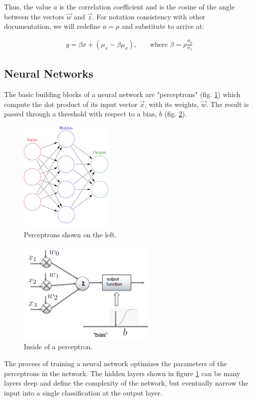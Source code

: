 \documentclass[11pt,a4paper]{article}
\begin{document}
Thus, the value $a$ is the correlation coefficient and is the cosine of the angle between the vectors $\vec{w}$ and $\vec{z}$. For notation consistency with other documentation, we will redefine $a= \rho$ and substitute to arrive at:

\begin{align*}
y = \beta x + (\mu_x - \beta \mu_x), \quad	&\text{where $\beta = \rho \frac{\sigma_y}{\sigma_x}$}
\end{align*}

\subsection{Neural Networks}
The basic building blocks of a neural network are "perceptrons" (fig. \ref{fig:nn}) which compute the dot product of its input vector $\vec{x}$, with its weights, $\vec{w}$. The result is passed through a threshold with respect to a bias, $b$ (fig. \ref{fig:nn1}).

\begin{figure}[ht]
\centering
\includegraphics[width=0.4\textwidth]{nn}
\caption{Perceptrons shown on the left.}
\label{fig:nn}
\end{figure}

\begin{figure}[ht]
\centering
\includegraphics[width=0.6\textwidth]{nn1}
\caption{Inside of a perceptron.}
\label{fig:nn1}
\end{figure}

The process of training a neural network optimizes the parameters of the perceptrons in the network. The hidden layers shown in figure \ref{fig:nn} can be many layers deep and define the complexity of the network, but eventually narrow the input into a single classification at the output layer.
\end{document}
